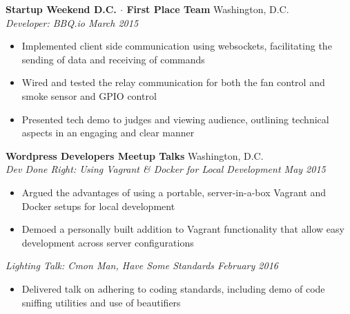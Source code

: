 \documentclass[10pt]{article}
\begin{document}
\textbf{Startup Weekend D.C. $\cdot$ First Place Team} \hfill Washington, D.C. \\
\textit{Developer: BBQ.io \hfill March 2015} \\
\vspace{-1.1em}
\begin{itemize}
  \item Implemented client side communication using websockets, facilitating the sending of data and receiving of commands
  \item Wired and tested the relay communication for both the fan control and smoke sensor and GPIO control
  \item Presented tech demo to judges and viewing audience, outlining technical aspects in an engaging and clear manner
\end{itemize}
\textbf{Wordpress Developers Meetup Talks} \hfill Washington, D.C. \\
\textit{Dev Done Right: Using Vagrant \& Docker for Local Development \hfill May 2015} \\
\vspace{-1.1em}
\begin{itemize}
  \item Argued the advantages of using a portable, server-in-a-box Vagrant and Docker setups for local development
  \item Demoed a personally built addition to Vagrant functionality that allow easy development across server configurations
\end{itemize}
\textit{Lighting Talk: C\textquotesingle{}mon Man, Have Some Standards \hfill February 2016} \\
\vspace{-1.1em}
\begin{itemize}
  \item Delivered talk on adhering to coding standards, including demo of code sniffing utilities and use of beautifiers
\end{itemize}
\end{document}
